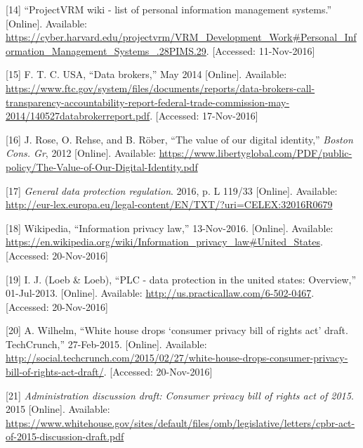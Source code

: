 \documentclass[12pt,english,a4paper,titlepage,cleardoublepage=empty,dottedtoc]{report}
\begin{document}
\hypertarget{ref-web_2010_projectvrm-wiki_pims-example-list}{}
{[}14{]} ``ProjectVRM wiki - list of personal information management
systems.'' {[}Online{]}. Available:
\url{https://cyber.harvard.edu/projectvrm/VRM_Development_Work\#Personal_Information_Management_Systems_.28PIMS.29}.
{[}Accessed: 11-Nov-2016{]}

\hypertarget{ref-report_2014_data-brokers}{}
{[}15{]} F. T. C. USA, ``Data brokers,'' May 2014 {[}Online{]}.
Available:
\url{https://www.ftc.gov/system/files/documents/reports/data-brokers-call-transparency-accountability-report-federal-trade-commission-may-2014/140527databrokerreport.pdf}.
{[}Accessed: 17-Nov-2016{]}

\hypertarget{ref-whitepaper_2012_the-value-of-our-digital-identity_definition}{}
{[}16{]} J. Rose, O. Rehse, and B. Röber, ``The value of our digital
identity,'' \emph{Boston Cons. Gr}, 2012 {[}Online{]}. Available:
\url{https://www.libertyglobal.com/PDF/public-policy/The-Value-of-Our-Digital-Identity.pdf}

\hypertarget{ref-regulation_2016_eu_general-data-protection-regulation_definition}{}
{[}17{]} \emph{General data protection regulation}. 2016, p. L 119/33
{[}Online{]}. Available:
\url{http://eur-lex.europa.eu/legal-content/EN/TXT/?uri=CELEX:32016R0679}

\hypertarget{ref-web_2016_wikipedia_information-privacy-law_us}{}
{[}18{]} Wikipedia, ``Information privacy law,'' 13-Nov-2016.
{[}Online{]}. Available:
\url{https://en.wikipedia.org/wiki/Information_privacy_law\#United_States}.
{[}Accessed: 20-Nov-2016{]}

\hypertarget{ref-web_2016_data-protection-laws-in-the-us}{}
{[}19{]} I. J. (Loeb \& Loeb), ``PLC - data protection in the united
states: Overview,'' 01-Jul-2013. {[}Online{]}. Available:
\url{http://us.practicallaw.com/6-502-0467}. {[}Accessed: 20-Nov-2016{]}

\hypertarget{ref-web_2015_white-house-releases-consumer-privacy-bill-draft}{}
{[}20{]} A. Wilhelm, ``White house drops `consumer privacy bill of
rights act' draft. TechCrunch,'' 27-Feb-2015. {[}Online{]}. Available:
\url{http://social.techcrunch.com/2015/02/27/white-house-drops-consumer-privacy-bill-of-rights-act-draft/}.
{[}Accessed: 20-Nov-2016{]}

\hypertarget{ref-bill-draft_2015_us_consumer-privacy-bill-of-rights-act_definition}{}
{[}21{]} \emph{Administration discussion draft: Consumer privacy bill of
rights act of 2015}. 2015 {[}Online{]}. Available:
\url{https://www.whitehouse.gov/sites/default/files/omb/legislative/letters/cpbr-act-of-2015-discussion-draft.pdf}
\end{document}
